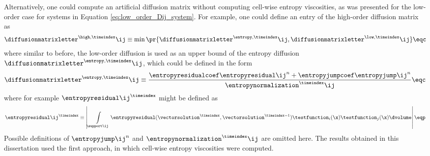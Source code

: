 Alternatively, one could compute an artificial diffusion matrix without
computing cell-wise entropy viscosities, as was presented for the low-order
case for systems in Equation \eqref{eq:low_order_Dij_system}.
For example, one could define an entry of the high-order diffusion matrix
as
\begin{equation}
  \diffusionmatrixletter^{\high,\timeindex}\ij \equiv
    \min\pr{\diffusionmatrixletter^{\entropy,\timeindex}\ij,
      \diffusionmatrixletter^{\low,\timeindex}\ij}
  \eqc
\end{equation}
where similar to before, the low-order diffusion is used as an upper
bound of the entropy diffusion $\diffusionmatrixletter^{\entropy,\timeindex}\ij$,
which could be defined in the form
\begin{equation}
  \diffusionmatrixletter^{\entropy,\timeindex}\ij \equiv
    \frac{\entropyresidualcoef\entropyresidual\ij^n +
      \entropyjumpcoef\entropyjump\ij^n}
      {\entropynormalization^\timeindex\ij}
  \eqc
\end{equation}
where for example $\entropyresidual\ij^\timeindex$ might be defined as
\begin{equation}
  \entropyresidual\ij^\timeindex \equiv \left|
    \int\limits_{\support\ij}
      \entropyresidual(\vectorsolution^\timeindex,\vectorsolution^{\timeindex-1})
      \testfunction_i(\x)
      \testfunction_j(\x) \dvolume
    \right|
  \eqp
\end{equation}
Possible definitions of $\entropyjump\ij^n$ and
$\entropynormalization^\timeindex\ij$ are omitted here.
The results obtained in this dissertation used the first approach, in
which cell-wise entropy viscosities were computed.


